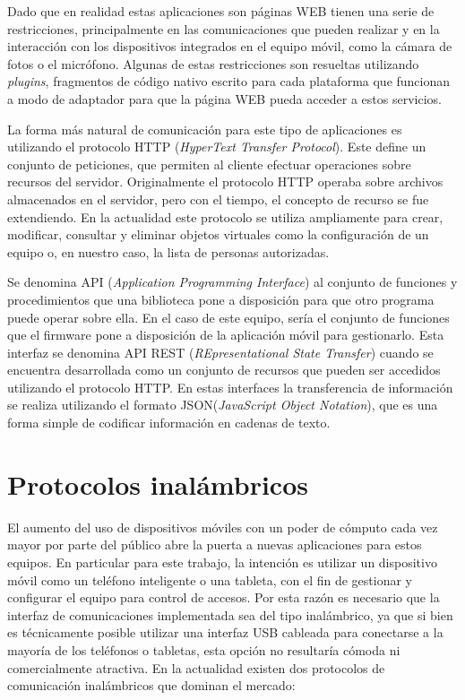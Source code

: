 Dado que en realidad estas aplicaciones son páginas WEB tienen una serie de restricciones, principalmente en las comunicaciones que pueden realizar y en la interacción con los dispositivos integrados en el equipo móvil, como la cámara de fotos o el micrófono. Algunas de estas restricciones son resueltas utilizando \emph{plugins}, fragmentos de código nativo escrito para cada plataforma que funcionan a modo de adaptador para que la página WEB pueda acceder a estos servicios.

La forma más natural de comunicación para este tipo de aplicaciones es utilizando el protocolo HTTP (\emph{HyperText Transfer Protocol})\cite{noauthor_protocolo_2020}. Este define un conjunto de peticiones, que permiten al cliente efectuar operaciones sobre recursos del servidor\cite{leach_hypertext_nodate}. Originalmente el protocolo HTTP operaba sobre archivos almacenados en el servidor, pero con el tiempo, el concepto de recurso se fue extendiendo. En la actualidad este protocolo se utiliza ampliamente para crear, modificar, consultar y eliminar objetos virtuales como la configuración de un equipo o, en nuestro caso, la lista de personas autorizadas. 

Se denomina API (\emph{Application Programming Interface})\cite{noauthor_interfaz_2019} al conjunto de funciones y procedimientos que una biblioteca pone a disposición para que otro programa puede operar sobre ella. En el caso de este equipo, sería el conjunto de funciones que el firmware pone a disposición de la aplicación móvil para gestionarlo. Esta interfaz se denomina API REST (\emph{REpresentational State Transfer}) cuando se encuentra desarrollada como un conjunto de recursos que pueden ser accedidos utilizando el protocolo HTTP. En estas interfaces la transferencia de información se realiza utilizando el formato JSON(\emph{JavaScript Object Notation})\cite{jsonorg_introduccion_nodate}, que es una forma simple de codificar información en cadenas de texto.

\section{Protocolos inalámbricos}

El aumento del uso de dispositivos móviles con un poder de cómputo cada vez mayor por parte del público abre la puerta a nuevas aplicaciones para estos equipos. En particular para este trabajo, la intención es utilizar un dispositivo móvil como un teléfono inteligente o una tableta, con el fin de gestionar y configurar el equipo para control de accesos. Por esta razón es necesario que la interfaz de comunicaciones implementada sea del tipo inalámbrico, ya que si bien es técnicamente posible utilizar una interfaz USB cableada para conectarse a la mayoría de los teléfonos o tabletas, esta opción no resultaría cómoda ni comercialmente atractiva. En la actualidad existen dos protocolos de comunicación inalámbricos que dominan el mercado:

